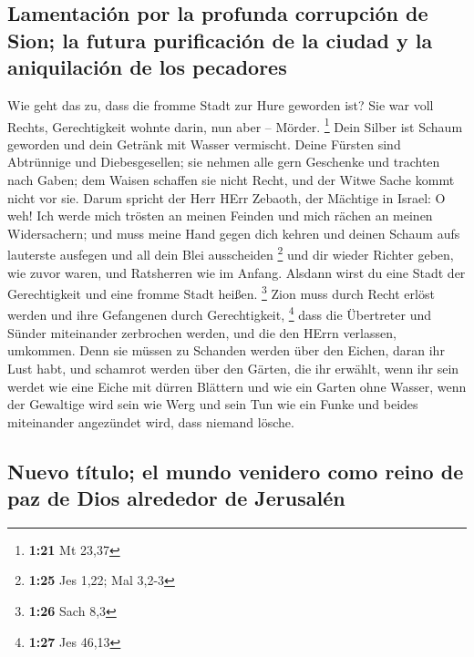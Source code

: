 \hypertarget{lamentaciuxf3n-por-la-profunda-corrupciuxf3n-de-sion-la-futura-purificaciuxf3n-de-la-ciudad-y-la-aniquilaciuxf3n-de-los-pecadores}{%
\subsection{Lamentación por la profunda corrupción de Sion; la futura
purificación de la ciudad y la aniquilación de los
pecadores}\label{lamentaciuxf3n-por-la-profunda-corrupciuxf3n-de-sion-la-futura-purificaciuxf3n-de-la-ciudad-y-la-aniquilaciuxf3n-de-los-pecadores}}

 Wie geht das zu, dass die fromme Stadt zur Hure geworden
ist? Sie war voll Rechts, Gerechtigkeit wohnte darin, nun aber --
Mörder. \footnote{\textbf{1:21} Mt 23,37}  Dein Silber
ist Schaum geworden und dein Getränk mit Wasser vermischt.
 Deine Fürsten sind Abtrünnige und Diebesgesellen; sie
nehmen alle gern Geschenke und trachten nach Gaben; dem Waisen schaffen
sie nicht Recht, und der Witwe Sache kommt nicht vor sie.
 Darum spricht der Herr HErr Zebaoth, der Mächtige in
Israel: O weh! Ich werde mich trösten an meinen Feinden und mich rächen
an meinen Widersachern;  und muss meine Hand gegen dich
kehren und deinen Schaum aufs lauterste ausfegen und all dein Blei
ausscheiden \footnote{\textbf{1:25} Jes 1,22; Mal 3,2-3} 
und dir wieder Richter geben, wie zuvor waren, und Ratsherren wie im
Anfang. Alsdann wirst du eine Stadt der Gerechtigkeit und eine fromme
Stadt heißen. \footnote{\textbf{1:26} Sach 8,3}  Zion
muss durch Recht erlöst werden und ihre Gefangenen durch Gerechtigkeit,
\footnote{\textbf{1:27} Jes 46,13}  dass die Übertreter
und Sünder miteinander zerbrochen werden, und die den HErrn verlassen,
umkommen.  Denn sie müssen zu Schanden werden über den
Eichen, daran ihr Lust habt, und schamrot werden über den Gärten, die
ihr erwählt,  wenn ihr sein werdet wie eine Eiche mit
dürren Blättern und wie ein Garten ohne Wasser,  wenn der
Gewaltige wird sein wie Werg und sein Tun wie ein Funke und beides
miteinander angezündet wird, dass niemand lösche.

\hypertarget{nuevo-tuxedtulo-el-mundo-venidero-como-reino-de-paz-de-dios-alrededor-de-jerusaluxe9n}{%
\subsection{Nuevo título; el mundo venidero como reino de paz de Dios
alrededor de
Jerusalén}\label{nuevo-tuxedtulo-el-mundo-venidero-como-reino-de-paz-de-dios-alrededor-de-jerusaluxe9n}}

